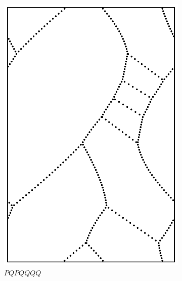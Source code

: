 \documentclass[12pt,twoside]{reedthesis}
\theoremstyle{definition}
\begin{document}
\begin{figure}[h]
\begin{subfigure}[t]{0.24\textwidth}
    \includegraphics[width=\textwidth]{figures/string_cheese_appendix/pqpqqqq.pdf}
    \caption*{$PQPQQQQ$}
    \vspace{5mm}
  \end{subfigure}
  \begin{subfigure}[t]{0.24\textwidth}

\end{subfigure}
\end{figure}
\end{document}
